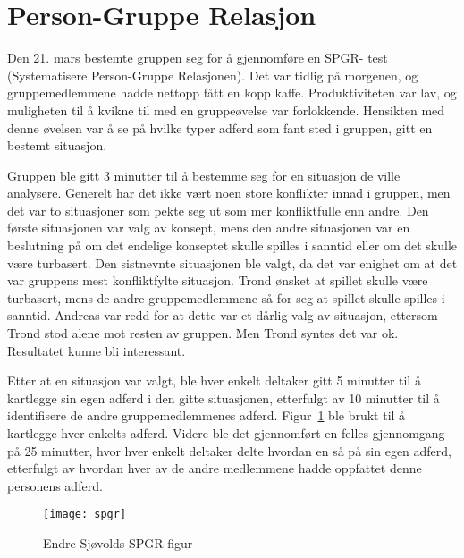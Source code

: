 \section{Person-Gruppe Relasjon} %
\label{sec:SPGR}
Den 21. mars bestemte gruppen seg for å gjennomføre en SPGR- test (Systematisere Person-Gruppe Relasjonen). Det var tidlig på morgenen, og gruppemedlemmene hadde nettopp fått en kopp kaffe. Produktiviteten var lav, og muligheten til å kvikne til med en gruppeøvelse var forlokkende. Hensikten med denne øvelsen var å se på hvilke typer adferd som fant sted i gruppen, gitt en bestemt situasjon. 

Gruppen ble gitt 3 minutter til å bestemme seg for en situasjon de ville analysere. Generelt har det ikke vært noen store konflikter innad i gruppen, men det var to situasjoner som pekte seg ut som mer konfliktfulle enn andre. Den første situasjonen var valg av konsept, mens den andre situasjonen var en beslutning på om det endelige konseptet skulle spilles i sanntid eller om det skulle være turbasert. Den sistnevnte situasjonen ble valgt, da det var enighet om at det var gruppens mest konfliktfylte situasjon. Trond ønsket at spillet skulle være turbasert, mens de andre gruppemedlemmene så for seg at spillet skulle spilles i sanntid. Andreas var redd for at dette var et dårlig valg av situasjon, ettersom Trond stod alene mot resten av gruppen. Men Trond syntes det var ok. Resultatet kunne bli interessant.

Etter at en situasjon var valgt, ble hver enkelt deltaker gitt 5
minutter til å kartlegge sin egen adferd i den gitte situasjonen,
etterfulgt av 10 minutter til å identifisere de andre gruppemedlemmenes
adferd. Figur~\ref{fig:spgr} ble brukt til å kartlegge hver enkelts
adferd. Videre ble det gjennomført en felles gjennomgang på 25 minutter,
hvor hver enkelt deltaker delte hvordan en så på sin egen adferd,
etterfulgt av hvordan hver av de andre medlemmene hadde oppfattet denne
personens adferd.

\begin{figure} [H]
		\begin{center}
			\texttt{[image: spgr]}
		\end{center}
	\caption{Endre Sjøvolds SPGR-figur}
	\label{fig:spgr}
\end{figure}

